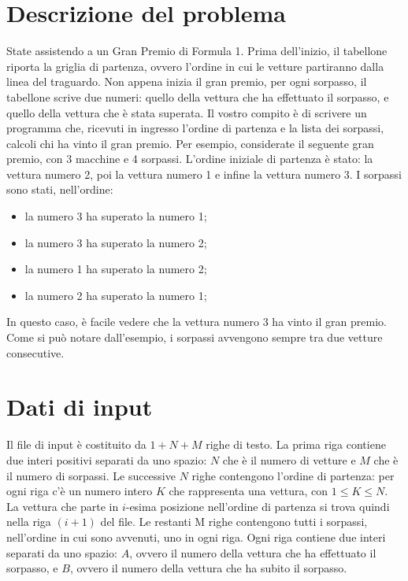 \documentclass[a4paper,11pt]{article}
\begin{document}
\vspace{0.5cm}



\vspace{0.5cm}

\section*{Descrizione del problema}
  
State assistendo a un Gran Premio di Formula 1. Prima dell'inizio, il
tabellone riporta la griglia di partenza, ovvero l'ordine in cui le
vetture partiranno dalla linea del traguardo. Non appena inizia il gran
premio, per ogni sorpasso, il tabellone scrive due numeri: quello della
vettura che ha effettuato il sorpasso, e quello della vettura che è
stata superata. Il vostro compito è di scrivere un programma che,
ricevuti in ingresso l'ordine di partenza e la lista dei sorpassi,
calcoli chi ha vinto il gran premio.  Per esempio, considerate il
seguente gran premio, con 3 macchine e 4 sorpassi. L'ordine iniziale di
partenza è stato: la vettura numero 2, poi la vettura numero 1 e infine
la vettura numero 3. I sorpassi sono stati, nell'ordine:
    
\begin{itemize}
  \item la numero 3 ha superato la numero 1;
  \item la numero 3 ha superato la numero 2;
  \item la numero 1 ha superato la numero 2;
  \item la numero 2 ha superato la numero 1;
\end{itemize}

In questo caso, è facile vedere che la vettura numero 3 ha vinto il gran
premio. Come si può notare dall'esempio, i sorpassi avvengono sempre tra
due vetture consecutive.
    
\section*{Dati di input}
  
Il file di input è costituito da $1+N+M$ righe di testo.  La prima riga
contiene due interi positivi separati da uno spazio: $N$ che è il numero
di vetture e $M$ che è il numero di sorpassi. Le successive $N$ righe
contengono l'ordine di partenza: per ogni riga c'è un numero intero $K$
che rappresenta una vettura, con $1 ≤ K ≤ N$. La vettura che parte in
$i$-esima posizione nell'ordine di partenza si trova quindi nella riga
$(i+1)$ del file.  Le restanti M righe contengono tutti i sorpassi,
nell'ordine in cui sono avvenuti, uno in ogni riga. Ogni riga contiene
due interi separati da uno spazio: $A$, ovvero il numero della vettura
che ha effettuato il sorpasso, e $B$, ovvero il numero della vettura che
ha subito il sorpasso. 
\end{document}
